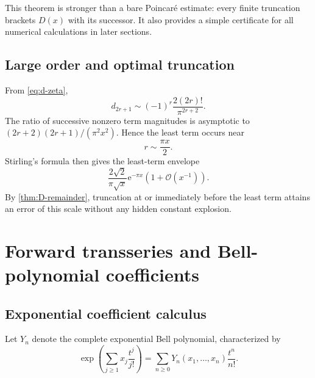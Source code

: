 \documentclass[11pt,a4paper]{article}
\numberwithin{equation}{section}
\theoremstyle{definition}
\theoremstyle{remark}
\newcommand{\e}{\mathrm e}
\newcommand{\Ord}{\mathcal O}
\begin{document}
This theorem is stronger than a bare Poincar\'e estimate: every finite
truncation brackets \(D(x)\) with its successor.  It also provides a simple
certificate for all numerical calculations in later sections.

\subsection{Large order and optimal truncation}

From \cref{eq:d-zeta},
\begin{equation}\label{eq:d-large-order}
 d_{2r+1}\sim(-1)^r\frac{2(2r)!}{\pi^{2r+2}}.
\end{equation}
The ratio of successive nonzero term magnitudes is asymptotic to
\((2r+2)(2r+1)/(\pi^2x^2)\).  Hence the least term occurs near
\begin{equation}\label{eq:optimal-r}
 r\sim\frac{\pi x}{2}.
\end{equation}
Stirling's formula then gives the least-term envelope
\begin{equation}\label{eq:least-term-envelope}
 \frac{2\sqrt2}{\pi\sqrt{x}}\e^{-\pi x}
 \left(1+\Ord(x^{-1})\right).
\end{equation}
By \cref{thm:D-remainder}, truncation at or immediately before the least
term attains an error of this scale without any hidden constant explosion.

\section{Forward transseries and Bell-polynomial coefficients}

\subsection{Exponential coefficient calculus}

Let \(Y_n\) denote the complete exponential Bell polynomial, characterized
by
\begin{equation}\label{eq:Bell-egf}
 \exp\left(\sum_{j\ge1}x_j\frac{t^j}{j!}\right)
 =\sum_{n\ge0}Y_n(x_1,\ldots,x_n)\frac{t^n}{n!}.
\end{equation}
\end{document}
